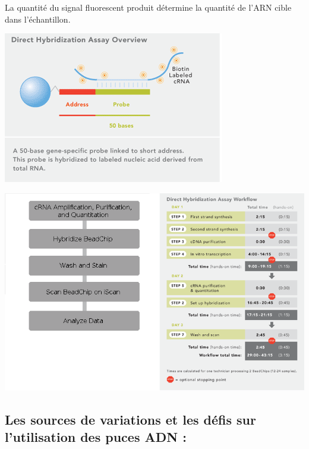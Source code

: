 \documentclass[a4paper,10pt]{article}
\begin{document}
La quantité du signal fluorescent produit détermine la quantité de l’ARN cible dans l’échantillon.
\begin{center}
 \includegraphics[scale=0.5]{./image/Direct_Hyb.png}
\end{center}
\begin{center}
 \includegraphics[scale=0.5]{./image/direct_hybridization_assay_workflow.png}
\end{center}

\subsection{Les sources de variations et les défis sur l'utilisation des puces ADN :}
\end{document}
